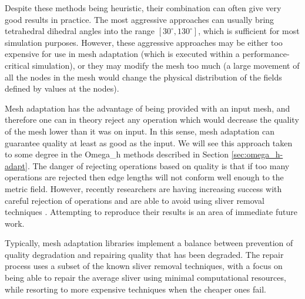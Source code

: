 Despite these methods being heuristic, their combination can often
give very good results in practice.
The most aggressive approaches
\cite{klingner2008aggressive,dassi2016tetrahedral}
can usually bring tetrahedral dihedral angles into
the range $[30^\circ,130^\circ]$, which is sufficient for
most simulation purposes.
However, these aggressive approaches may be either too expensive
for use in mesh adaptation (which is executed within a
performance-critical simulation), or they may modify the mesh
too much (a large movement of all the nodes in the mesh would
change the physical distribution of the fields defined by values
at the nodes).

Mesh adaptation has the advantage of being provided with an input
mesh, and therefore one can in theory reject any operation which
would decrease the quality of the mesh lower than it was on input.
In this sense, mesh adaptation can guarantee quality at least as good
as the input.
We will see this approach taken to some degree in the Omega\_h methods
described in Section \ref{sec:omega_h-adapt}.
The danger of rejecting operations based on quality is that
if too many operations are rejected then edge lengths will
not conform well enough to the metric field.
However, recently researchers are having increasing success with
careful rejection of operations and are able to avoid using
sliver removal techniques \cite{loseille20093d,michal2012anisotropic}.
Attempting to reproduce their results is an area of immediate future work.

Typically, mesh adaptation libraries implement a balance
between prevention of quality degradation and repairing
quality that has been degraded.
The repair process uses a subset of the known sliver removal
techniques, with a focus on being able to repair the average
sliver using minimal computational resources, while resorting
to more expensive techniques when the cheaper ones fail.

